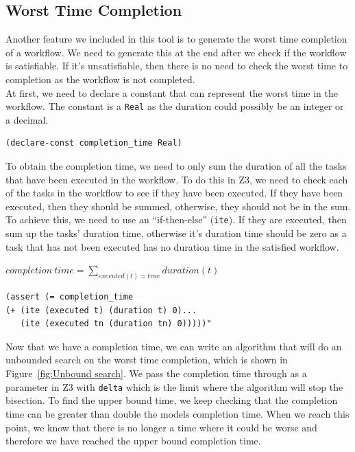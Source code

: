 \documentclass[a4paper]{report}
\begin{document}
\subsection{Worst Time Completion}
Another feature we included in this tool is to generate the worst time completion of a workflow. We need to generate this at the end after we check if the workflow is satisfiable. If it's unsatisfiable, then there is no need to check the worst time to completion as the workflow is not completed.\\

At first, we need to declare a constant that can represent the worst time in the workflow. The constant is a \texttt{Real} as the duration could possibly be an integer or a decimal. 
\begin{lstlisting}[frame=single]
(declare-const completion_time Real)
\end{lstlisting}

To obtain the completion time, we need to only sum the duration of all the tasks that have been executed in the workflow. To do this in Z3, we need to check each of the tasks in the workflow to see if they have been executed. If they have been executed, then they should be summed, otherwise, they should not be in the sum. To achieve this, we need to use an ``if-then-else'' (\texttt{ite}). If they are executed, then sum up the tasks' duration time, otherwise it's duration time should be zero as a task that has not been executed has no duration time in the satisfied workflow.
\begin{center}
$completion\ time = \sum\nolimits_{executed(t) = true} duration(t)$
\end{center}

\begin{lstlisting}[frame=single]
(assert (= completion_time
(+ (ite (executed t) (duration t) 0)...
   (ite (executed tn (duration tn) 0)))))"
\end{lstlisting}

Now that we have a completion time, we can write an algorithm that will do an unbounded search on the worst time completion, which is shown in Figure~\ref{fig:Unbound search}. We pass the completion time through as a parameter in Z3 with \texttt{delta} which is the limit where the algorithm will stop the bisection. To find the upper bound time, we keep checking that the completion time can be greater than double the models completion time. When we reach this point, we know that there is no longer a time where it could be worse and therefore we have reached the upper bound completion time. \\
\end{document}
